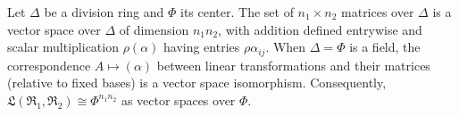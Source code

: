 Let $\Delta$ be a division ring and $\Phi$ its center. The set of $n_1 \times n_2$ matrices over $\Delta$ is a vector space over $\Delta$ of dimension $n_1 n_2$, with addition defined entrywise and scalar multiplication $\rho(\alpha)$ having entries $\rho \alpha_{ij}$. When $\Delta = \Phi$ is a field, the correspondence $A \mapsto (\alpha)$ between linear transformations and their matrices (relative to fixed bases) is a vector space isomorphism. Consequently, $\mathfrak{L}(\mathfrak{R}_1, \mathfrak{R}_2) \cong \Phi^{n_1 n_2}$ as vector spaces over $\Phi$.
